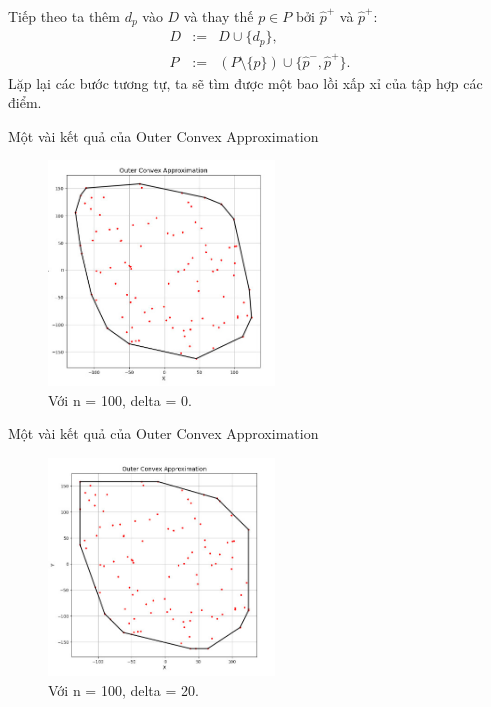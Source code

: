 \documentclass[11pt]{beamer}
\theoremstyle{definition}
\theoremstyle{plain}
\theoremstyle{plain}
\theoremstyle{remark}
\begin{document}
	\begin{frame}
		Tiếp theo ta thêm $d_p$ vào $D$ và thay thế $p \in P$ bởi $\hat p^+$ và $\hat p^+$:
		\begin{equation}\label{newDP1}
			\begin{array}{lcl}
				D &:=& D \cup \{d_{p}\}, \\
				P &:=&(P \setminus \{p\}) \cup \{\hat p^-, \hat p^+\}.
			\end{array}
		\end{equation}
		Lặp lại các bước tương tự, ta sẽ tìm được một bao lồi xấp xỉ của tập hợp các điểm.
	\end{frame}
	
	\begin{frame}{Một vài kết quả của Outer Convex Approximation}
		\begin{figure}
			\begin{center}
				\includegraphics[width=6cm]{./result_outer_cv_delta0.jpg}
				\caption{Với n = 100, delta = 0.}
				\label{result_outer_cv_delta0}
			\end{center}
		\end{figure}
		
	\end{frame}
	\begin{frame}{Một vài kết quả của Outer Convex Approximation}
		\begin{figure}
			\begin{center}
				\includegraphics[width=6cm]{./result_outer_cv_delta20.jpg}
				\caption{Với n = 100, delta = 20.}
				\label{result_outer_cv_delta20}
			\end{center}
		\end{figure}
		
	\end{frame}
\end{document}
